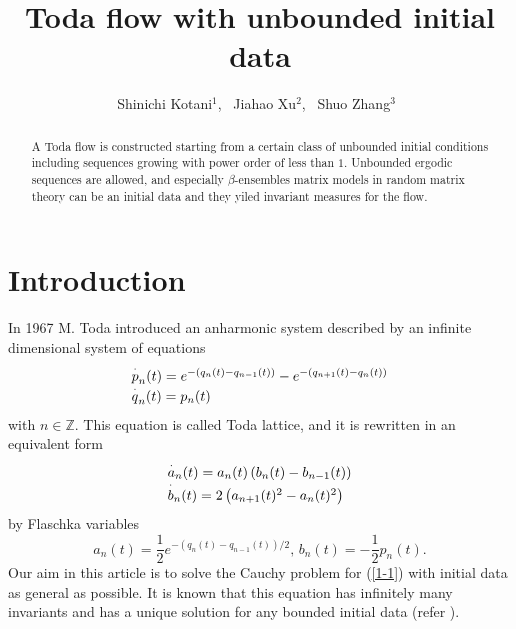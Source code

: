\documentclass[a4paper]{article}%
\begin{document}
\title{Toda flow with unbounded initial data}
\author{Shinichi Kotani$^{1}$, \ Jiahao Xu$^{2}$, \ Shuo Zhang$^{3}$\ }
\date{}
\maketitle

\begin{abstract}
A Toda flow is constructed starting from a certain class of unbounded initial
conditions including sequences growing with power order of less than $1$.
Unbounded ergodic sequences are allowed, and especially $\beta$-ensembles
matrix models in random matrix theory can be an initial data and they yiled
invariant measures for the flow.

\end{abstract}

\section{Introduction}

In 1967 M. Toda introduced an anharmonic system described by an
infinite dimensional system of equations%
\[%
\begin{array}
[c]{l}%
\overset{\cdot}{p}_{n}(t)=e^{-\left(  q_{n}(t)-q_{n-1}(t)\right)
}-e^{-\left(  q_{n+1}(t)-q_{n}(t)\right)  }\\
\overset{\cdot}{q}_{n}(t)=p_{n}(t)
\end{array}
\]
with $n\in\mathbb{Z}$. This equation is called Toda lattice, and it is
rewritten in an equivalent form%
\begin{equation}%
\begin{array}
[c]{l}%
\overset{\cdot}{a}_{n}(t)=a_{n}(t)\left(  b_{n}(t)-b_{n-1}(t)\right) \\
\overset{\cdot}{b}_{n}(t)=2\left(  a_{n+1}(t)^{2}-a_{n}(t)^{2}\right)
\end{array}
\label{1-1}%
\end{equation}
by Flaschka variables%
\[
a_{n}(t)=\dfrac{1}{2}e^{-\left(  q_{n}(t)-q_{n-1}(t)\right)  /2}\text{,
\ \ }b_{n}(t)=-\dfrac{1}{2}p_{n}(t)\text{.}%
\]
Our aim in this article is to solve the Cauchy problem for (\ref{1-1}) with
initial data as general as possible. It is known that this equation has
infinitely many invariants and has a unique solution for any bounded initial
data (refer \cite{t}).
\end{document}
